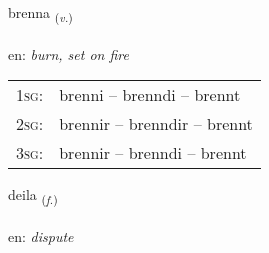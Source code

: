 \documentclass[frontgrid, backgrid]{flacards}\usepackage[]{graphicx}\usepackage[]{color}
\begin{document}
\renewcommand{\flhead}{\vskip5pt \fboxsep=0pt {\small\bfseries\footnotesize Sagnorð | Verb}}
\renewcommand{\fcfoot}{\vskip5pt \fboxsep=0pt \hspace{2pt}{\small\bfseries\footnotesize 2K}}

\renewcommand{\blhead}{\vskip5pt {\small\bfseries\footnotesize Sagnorð | Verb }}
\renewcommand{\bcfoot}{\vskip5pt \hspace{2pt}{\small\bfseries\footnotesize 2K}}


{brenna \small{\textsubscript{(\textit{v.})}} \\[1ex] %
\textphonetic{[prɛna]} \\
en: \emph{burn, set on fire} \\  [2ex]
\renewcommand*{\arraystretch}{0.8}
\begin{tabular}{p{1cm}l}
\textsc{1sg}: & brenni -- brenndi -- brennt \\ 
\textsc{2sg}: & brennir -- brenndir -- brennt \\ 
\textsc{3sg}: & brennir -- brenndi -- brennt \\ 
\end{tabular}
}

\renewcommand{\flhead}{\vskip5pt \fboxsep=0pt {\small\bfseries\footnotesize Nafnorð | Noun}}
\renewcommand{\fcfoot}{\vskip5pt \fboxsep=0pt \hspace{2pt}{\small\bfseries\footnotesize 2K}}

\renewcommand{\blhead}{\vskip5pt {\small\bfseries\footnotesize Nafnorð | Noun }}
\renewcommand{\bcfoot}{\vskip5pt \hspace{2pt}{\small\bfseries\footnotesize 2K}}


{deila \small{\textsubscript{(\textit{f.})}} \\[1ex] %
\textphonetic{[teiːla]} \\
en: \emph{dispute} \\  [2ex]
\renewcommand*{\arraystretch}{0.8}
}
\end{document}
